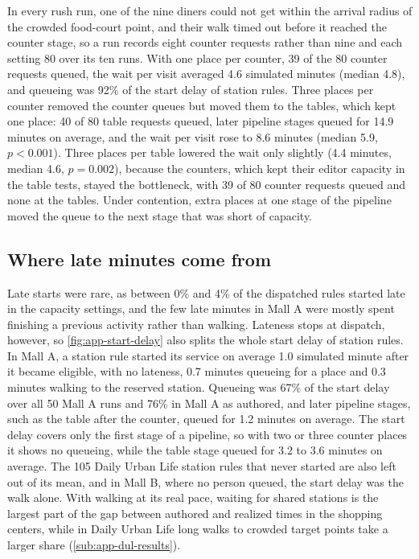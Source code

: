 In every rush run, one of the nine diners could not get within the arrival radius of the crowded food-court point, and their walk timed out before it reached the counter stage, so a run records eight counter requests rather than nine and each setting 80 over its ten runs. With one place per counter, 39 of the 80 counter requests queued, the wait per visit averaged 4.6 simulated minutes (median 4.8), and queueing was 92\% of the start delay of station rules. Three places per counter removed the counter queues but moved them to the tables, which kept one place: 40 of 80 table requests queued, later pipeline stages queued for 14.9 minutes on average, and the wait per visit rose to 8.6 minutes (median 5.9, $p<0.001$). Three places per table lowered the wait only slightly (4.4 minutes, median 4.6, $p=0.002$), because the counters, which kept their editor capacity in the table tests, stayed the bottleneck, with 39 of 80 counter requests queued and none at the tables. Under contention, extra places at one stage of the pipeline moved the queue to the next stage that was short of capacity.

\subsection{Where late minutes come from}
\label{sub:app-mall-late}

Late starts were rare, as between 0\% and 4\% of the dispatched rules started late in the capacity settings, and the few late minutes in Mall A were mostly spent finishing a previous activity rather than walking. Lateness stops at dispatch, however, so \cref{fig:app-start-delay} also splits the whole start delay of station rules. In Mall A, a station rule started its service on average 1.0 simulated minute after it became eligible, with no lateness, 0.7 minutes queueing for a place and 0.3 minutes walking to the reserved station. Queueing was 67\% of the start delay over all 50 Mall A runs and 76\% in Mall A as authored, and later pipeline stages, such as the table after the counter, queued for 1.2 minutes on average. The start delay covers only the first stage of a pipeline, so with two or three counter places it shows no queueing, while the table stage queued for 3.2 to 3.6 minutes on average. The 105 Daily Urban Life station rules that never started are also left out of its mean, and in Mall B, where no person queued, the start delay was the walk alone. With walking at its real pace, waiting for shared stations is the largest part of the gap between authored and realized times in the shopping centers, while in Daily Urban Life long walks to crowded target points take a larger share (\cref{sub:app-dul-results}).

